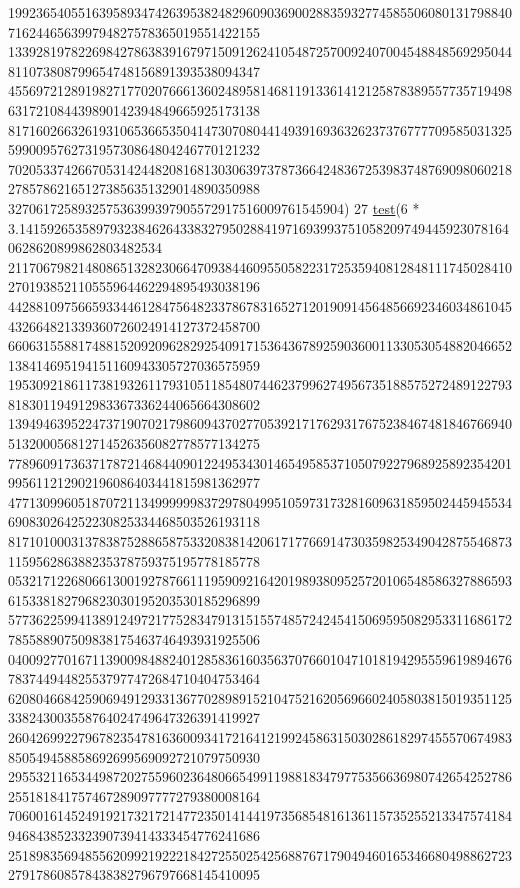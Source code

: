 \begin{DoxyCode}
      199236540551639589347426395382482960903690028835932774585506080131798840716244656399794827578365019551422155
      133928197822698427863839167971509126241054872570092407004548848569295044811073808799654748156891393538094347
      455697212891982717702076661360248958146811913361412125878389557735719498631721084439890142394849665925173138
      817160266326193106536653504147307080441493916936326237376777709585031325599009576273195730864804246770121232
      702053374266705314244820816813030639737873664248367253983748769098060218278578621651273856351329014890350988
      327061725893257536399397905572917516009761545904)
27 \hyperlink{namespacetest_math_accae4d78fc0739220d35c06c2c0d5822}{test}(6 * 3.14159265358979323846264338327950288419716939937510582097494459230781640628620899862803482534
      211706798214808651328230664709384460955058223172535940812848111745028410270193852110555964462294895493038196
      442881097566593344612847564823378678316527120190914564856692346034861045432664821339360726024914127372458700
      660631558817488152092096282925409171536436789259036001133053054882046652138414695194151160943305727036575959
      195309218611738193261179310511854807446237996274956735188575272489122793818301194912983367336244065664308602
      139494639522473719070217986094370277053921717629317675238467481846766940513200056812714526356082778577134275
      778960917363717872146844090122495343014654958537105079227968925892354201995611212902196086403441815981362977
      477130996051870721134999999837297804995105973173281609631859502445945534690830264252230825334468503526193118
      817101000313783875288658753320838142061717766914730359825349042875546873115956286388235378759375195778185778
      053217122680661300192787661119590921642019893809525720106548586327886593615338182796823030195203530185296899
      577362259941389124972177528347913151557485724245415069595082953311686172785588907509838175463746493931925506
      040092770167113900984882401285836160356370766010471018194295559619894676783744944825537977472684710404753464
      620804668425906949129331367702898915210475216205696602405803815019351125338243003558764024749647326391419927
      260426992279678235478163600934172164121992458631503028618297455570674983850549458858692699569092721079750930
      295532116534498720275596023648066549911988183479775356636980742654252786255181841757467289097777279380008164
      706001614524919217321721477235014144197356854816136115735255213347574184946843852332390739414333454776241686
      251898356948556209921922218427255025425688767179049460165346680498862723279178608578438382796797668145410095

\end{DoxyCode}

